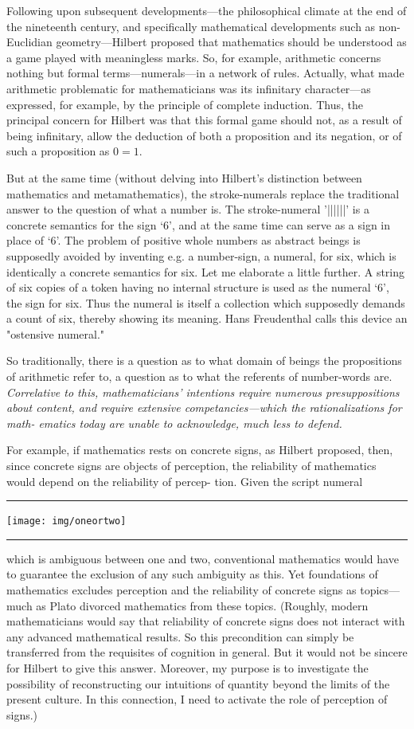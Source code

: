 Following upon subsequent developments---the philosophical 
climate at the end of the nineteenth century, and specifically 
mathematical developments such as non-Euclidian geometry---Hilbert proposed 
that mathematics should be understood as a game played with meaningless marks. 
So, for example, arithmetic concerns nothing but formal 
terms---numerals---in a network of rules. Actually, what made arithmetic 
problematic for mathematicians was its infinitary character---as 
expressed, for example, by the principle of complete induction. Thus, 
the principal concern for Hilbert was that this formal game should not, 
as a result of being infinitary, allow the deduction of both a proposition 
and its negation, or of such a proposition as $0=1$. 

But at the same time (without delving into Hilbert's distinction 
between mathematics and metamathematics), the stroke-numerals 
replace the traditional answer to the question of what a number is. The 
stroke-numeral '||||||' is a concrete semantics for the sign `6', and at the 
same time can serve as a sign in place of `6'. The problem of positive 
whole numbers as abstract beings is supposedly avoided by inventing 
e.g. a number-sign, a numeral, for six, which is identically a concrete 
semantics for six. Let me elaborate a little further. A string of six copies 
of a token having no internal structure is used as the numeral `6', the 
sign for six. Thus the numeral is itself a collection which supposedly 
demands a count of six, thereby showing its meaning. Hans Freudenthal 
calls this device an "ostensive numeral." 

So traditionally, there is a question as to what domain of beings 
the propositions of arithmetic refer to, a question as to what the 
referents of number-words are. \emph{Correlative to this, mathematicians' 
intentions require numerous presuppositions about content, and 
require extensive competancies---which the rationalizations for math- 
ematics today are unable to acknowledge, much less to defend.}

For example, if mathematics rests on concrete signs, as Hilbert 
proposed, then, since concrete signs are objects of perception, the 
reliability of mathematics would depend on the reliability of percep- 
tion. Given the script numeral 
{\plainbreak{1}\centering\texttt{[image: img/oneortwo]}\plainbreak{1}}
which is ambiguous between one and two, conventional mathematics 
would have to guarantee the exclusion of any such ambiguity as this. 
Yet foundations of mathematics excludes perception and the reliability 
of concrete signs as topics---much as Plato divorced mathematics from 
these topics. (Roughly, modern mathematicians would say that reliability 
of concrete signs does not interact with any advanced mathematical 
results. So this precondition can simply be transferred from the requisites 
of cognition in general. But it would not be sincere for Hilbert to 
give this answer. Moreover, my purpose is to investigate the possibility 
of reconstructing our intuitions of quantity beyond the limits of the 
present culture. In this connection, I need to activate the role of 
perception of signs.) 

